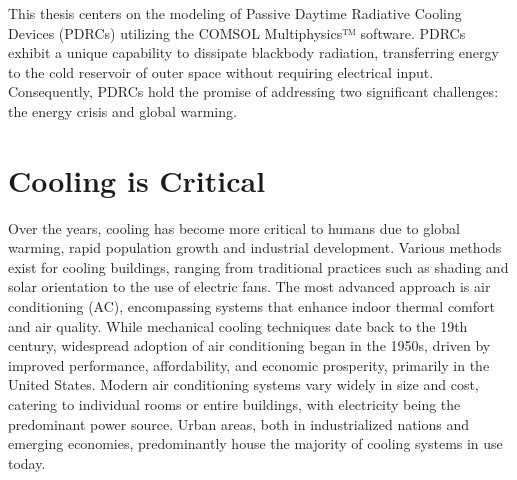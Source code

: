 


This thesis centers on the modeling of Passive Daytime Radiative Cooling Devices (PDRCs) utilizing the COMSOL Multiphysics™ software. PDRCs exhibit a unique capability to dissipate blackbody radiation, transferring energy to the cold reservoir of outer space without requiring electrical input. Consequently, PDRCs hold the promise of addressing two significant challenges: the energy crisis and global warming. %

\section{Cooling is Critical}
Over the years, cooling has become more critical to humans due to global warming, rapid population growth and industrial development. Various methods exist for cooling buildings, ranging from traditional practices such as shading and solar orientation to the use of electric fans. The most advanced approach is air conditioning (AC), encompassing systems that enhance indoor thermal comfort and air quality. While mechanical cooling techniques date back to the 19th century, widespread adoption of air conditioning began in the 1950s, driven by improved performance, affordability, and economic prosperity, primarily in the United States. Modern air conditioning systems vary widely in size and cost, catering to individual rooms or entire buildings, with electricity being the predominant power source. Urban areas, both in industrialized nations and emerging economies, predominantly house the majority of cooling systems in use today. 

